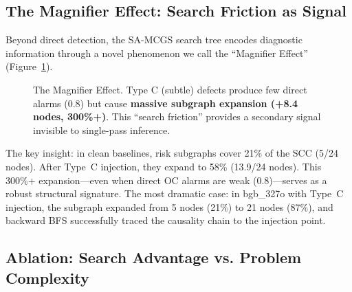 \documentclass{article}
\begin{document}
\subsection{The Magnifier Effect: Search Friction as Signal}

Beyond direct detection, the SA-MCGS search tree encodes diagnostic information through a novel phenomenon we call the ``Magnifier Effect'' (Figure~\ref{fig:magnifier}).

\begin{figure}[t]
    \centering
    \caption{The Magnifier Effect. Type C (subtle) defects produce few direct alarms (0.8) but cause \textbf{massive subgraph expansion (+8.4 nodes, 300\%+)}. This ``search friction'' provides a secondary signal invisible to single-pass inference.}
    \label{fig:magnifier}
\end{figure}

The key insight: in clean baselines, risk subgraphs cover 21\% of the SCC (5/24 nodes). After Type~C injection, they expand to 58\% (13.9/24 nodes). This 300\%+ expansion---even when direct OC alarms are weak (0.8)---serves as a robust structural signature. The most dramatic case: in bgb\_327o with Type~C injection, the subgraph expanded from 5 nodes (21\%) to 21 nodes (87\%), and backward BFS successfully traced the causality chain to the injection point.

\subsection{Ablation: Search Advantage vs. Problem Complexity}
\end{document}
